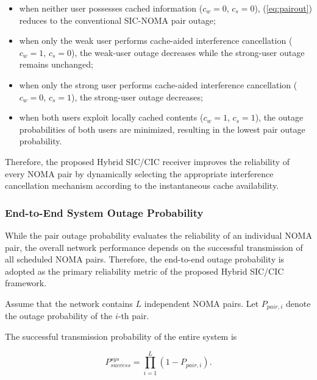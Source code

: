 \documentclass[12pt,a4paper]{article}
\begin{document}
\begin{itemize}

\item when neither user possesses cached information ($c_w=0$, $c_s=0$), (\ref{eq:pairout}) reduces to the conventional SIC-NOMA pair outage;

\item when only the weak user performs cache-aided interference cancellation ($c_w=1$, $c_s=0$), the weak-user outage decreases while the strong-user outage remains unchanged;

\item when only the strong user performs cache-aided interference cancellation ($c_w=0$, $c_s=1$), the strong-user outage decreases;

\item when both users exploit locally cached contents ($c_w=1$, $c_s=1$), the outage probabilities of both users are minimized, resulting in the lowest pair outage probability.

\end{itemize}

Therefore, the proposed Hybrid SIC/CIC receiver improves the reliability of every NOMA pair by dynamically selecting the appropriate interference cancellation mechanism according to the instantaneous cache availability.
\subsubsection{End-to-End System Outage Probability}

While the pair outage probability evaluates the reliability of an individual NOMA pair, the overall network performance depends on the successful transmission of all scheduled NOMA pairs. Therefore, the end-to-end outage probability is adopted as the primary reliability metric of the proposed Hybrid SIC/CIC framework.

Assume that the network contains $L$ independent NOMA pairs. Let
$P_{pair,i}$ denote the outage probability of the $i$-th pair.

The successful transmission probability of the entire system is

\begin{equation}
P_{success}^{sys}
=
\prod_{i=1}^{L}
\left(1-P_{pair,i}\right).
\label{eq:success_system}
\end{equation}
\end{document}
